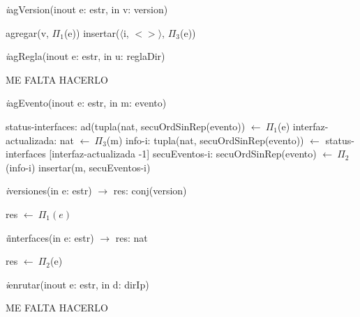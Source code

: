 \vspace{11pt}

\textit{i}agVersion(inout e: estr, in v: version)\\
\begin{algorithm}[H]
\BlankLine
agregar(v, $\Pi_1$(e))
\BlankLine
insertar($\langle$i, $<>\rangle$, $\Pi_3$(e))
\end{algorithm}

\vspace{11pt}

\textit{i}agRegla(inout e: estr, in u: reglaDir)\\
\begin{algorithm}[H]
\BlankLine
ME FALTA HACERLO
\end{algorithm}

\vspace{11pt}

\textit{i}agEvento(inout e: estr, in m: evento)\\
\begin{algorithm}[H]
\BlankLine
status-interfaces: ad(tupla(nat, secuOrdSinRep(evento)) $\leftarrow\ \Pi_1$(e)
\BlankLine
interfaz-actualizada: nat $\leftarrow\ \Pi_3$(m)
\BlankLine
info-i: tupla(nat, secuOrdSinRep(evento)) $\leftarrow$ status-interfaces [interfaz-actualizada -1]
\BlankLine
secuEventos-i: secuOrdSinRep(evento) $\leftarrow\ \Pi_2$(info-i)
\BlankLine
insertar(m, secuEventos-i)
\end{algorithm}

\vspace{11pt}

\textit{i}versiones(in e: estr) $\longrightarrow$ res: conj(version)\\
\begin{algorithm}[H]
\BlankLine
res $\leftarrow\ \Pi_1(e)$
\end{algorithm}

\vspace{11pt}

\textit{i}interfaces(in e: estr) $\longrightarrow$ res: nat\\
\begin{algorithm}[H]
\BlankLine
res $\leftarrow\ \Pi_2$(e)
\end{algorithm}

\vspace{11pt}

\textit{i}enrutar(inout e: estr, in d: dirIp)\\
\begin{algorithm}[H]
\BlankLine
ME FALTA HACERLO
\end{algorithm}

